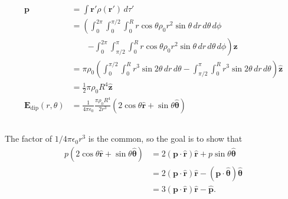 \documentclass{article}
\renewcommand{\vec}[1]{\boldsymbol{\mathbf{#1}}}
\newcommand{\uvec}[1]{\hat{\vec{#1}}}
\newcommand{\ke}{\frac{1}{4 \pi \epsilon_0}}
\begin{document}
\subsection{}

\begin{align*}
  \vec{p}                       & = \int \vec{r}' \rho(\vec{r}') \,d \tau'                                                                                                                           \\
                                & = \left( \int_0^{2 \pi} \int_0^{\pi / 2} \int_0^R r \cos \theta \rho_0 r^2 \sin \theta \,d r \,d \theta \,d \phi \right.                                           \\
                                & \qquad \left. - \int_0^{2 \pi} \int_{\pi / 2}^\pi \int_0^R r \cos \theta \rho_0 r^2 \sin \theta \,d r \,d \theta \,d \phi \right) \uvec{z}                         \\
                                & = \pi \rho_0 \left( \int_0^{\pi / 2} \int_0^R r^3 \sin 2 \theta \,d r \,d \theta - \int_{\pi / 2}^\pi \int_0^R r^3 \sin 2 \theta \,d r \,d \theta \right) \uvec{z} \\
                                & = \frac{1}{2} \pi \rho_0 R^4 \uvec{z}                                                                                                                              \\
  \vec{E}_\text{dip}(r, \theta) & = \ke \frac{\pi \rho_0 R^4}{2 r^3} (2 \cos \theta \uvec{r} + \sin \theta \uvec{\theta})
\end{align*}

\subsection{}

The factor of $1 / 4 \pi \epsilon_0 r^3$ is the common, so the goal is to show that \begin{align*}
  p (2 \cos \theta \uvec{r} + \sin \theta \uvec{\theta}) & = 2 (\vec{p} \cdot \uvec{r}) \uvec{r} + p \sin \theta \uvec{\theta}                 \\
                                                         & = 2 (\vec{p} \cdot \uvec{r}) \uvec{r} - (\vec{p} \cdot \uvec{\theta}) \uvec{\theta} \\
                                                         & = 3 (\vec{p} \cdot \uvec{r}) \uvec{r} - \uvec{p}.
\end{align*}
\end{document}
